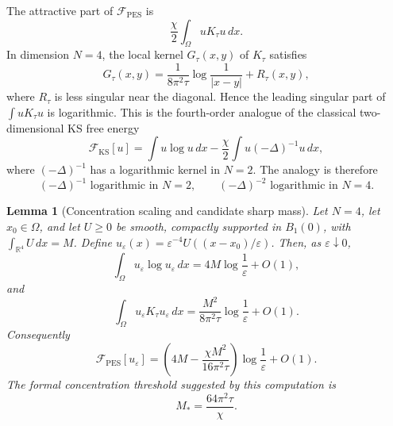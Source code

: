 \documentclass[pdflatex,sn-mathphys-num]{sn-jnl}%
\theoremstyle{thmstyleone}
\newtheorem{lemma}[theorem]{Lemma}
\theoremstyle{thmstyletwo}
\theoremstyle{thmstylethree}
\begin{document}
The attractive part of \(\mathcal F_{\mathrm{PES}}\) is
\begin{equation}
        \frac{\chi}{2}\int_\Omega uK_\tau u\,dx.
\label{attraction-term}
\end{equation}
In dimension \(N=4\), the local kernel \(G_\tau(x,y)\) of \(K_\tau\) satisfies
\begin{equation}
        G_\tau(x,y)
        =
        \frac{1}{8\pi^2\tau}\log\frac1{|x-y|}
        +
        R_\tau(x,y),
\label{kernel-log-four}
\end{equation}
where \(R_\tau\) is less singular near the diagonal.  Hence the leading
singular part of \(\int uK_\tau u\) is logarithmic.  This is the fourth-order
analogue of the classical two-dimensional KS free energy
\begin{equation}
        \mathcal F_{\mathrm{KS}}[u]
        =
        \int u\log u\,dx
        -
        \frac{\chi}{2}\int u(-\Delta)^{-1}u\,dx,
\label{KS-free-energy-comparison}
\end{equation}
where \((-\Delta)^{-1}\) has a logarithmic kernel in \(N=2\).  The
analogy is therefore
\begin{equation}
        (-\Delta)^{-1}\text{ logarithmic in }N=2,
        \qquad
        (-\Delta)^{-2}\text{ logarithmic in }N=4.
\label{log-analogy}
\end{equation}

\begin{lemma}[Concentration scaling and candidate sharp mass]
\label{lem:candidate-mass}
Let \(N=4\), let \(x_0\in\Omega\), and let \(U\ge0\) be smooth, compactly
supported in \(B_1(0)\), with \(\int_{\mathbb R^4}U\,dx=M\).  Define
\(u_\varepsilon(x)=\varepsilon^{-4}U((x-x_0)/\varepsilon)\).  Then, as
\(\varepsilon\downarrow0\),
\begin{equation}
        \int_\Omega u_\varepsilon\log u_\varepsilon\,dx
        =
        4M\log\frac1\varepsilon+O(1),
\label{entropy-scaling}
\end{equation}
and
\begin{equation}
        \int_\Omega u_\varepsilon K_\tau u_\varepsilon\,dx
        =
        \frac{M^2}{8\pi^2\tau}\log\frac1\varepsilon+O(1).
\label{interaction-scaling}
\end{equation}
Consequently
\begin{equation}
        \mathcal F_{\mathrm{PES}}[u_\varepsilon]
        =
        \left(
        4M-\frac{\chi M^2}{16\pi^2\tau}
        \right)
        \log\frac1\varepsilon+O(1).
\label{energy-scaling}
\end{equation}
The formal concentration threshold suggested by this computation is
\begin{equation}
        M_*=\frac{64\pi^2\tau}{\chi}.
\label{candidate-critical-mass}
\end{equation}
\end{lemma}
\end{document}
